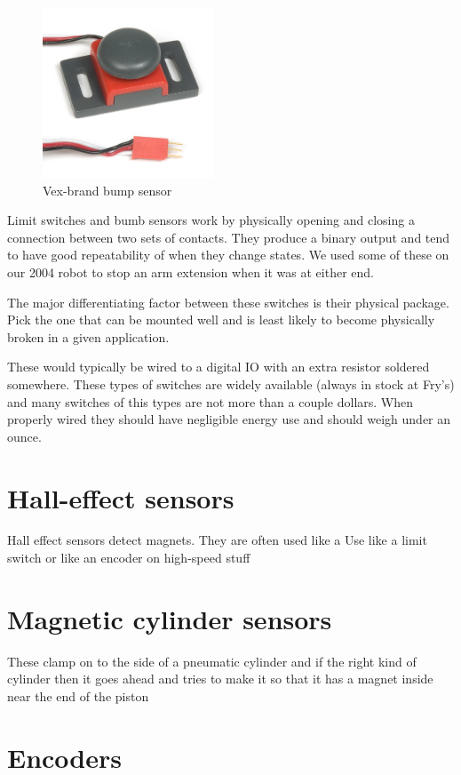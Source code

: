\documentclass{article}
\begin{document}
\begin{figure}[ht]
\centering
\includegraphics[width=2in]{vex_switch.jpg}
\caption{Vex-brand bump sensor}
\end{figure}

Limit switches and bumb sensors work by physically opening and closing a connection between two sets of contacts.  They produce a binary output and tend to have good repeatability of when they change states.  We used some of these on our 2004 robot to stop an arm extension when it was at either end.  

The major differentiating factor between these switches is their physical package.  Pick the one that can be mounted well and is least likely to become physically broken in a given application.  

These would typically be wired to a digital IO with an extra resistor soldered somewhere.  These types of switches are widely available (always in stock at Fry's) and many switches of this types are not more than a couple dollars.  When properly wired they should have negligible energy use and should weigh under an ounce.  

\section{Hall-effect sensors}
Hall effect sensors detect magnets.  They are often used like a Use like a limit switch or like an encoder on high-speed stuff

\section{Magnetic cylinder sensors}
These clamp on to the side of a pneumatic cylinder and if the right kind of cylinder then it goes ahead and tries to make it so that it has a magnet inside near the end of the piston

\section{Encoders}
\end{document}
